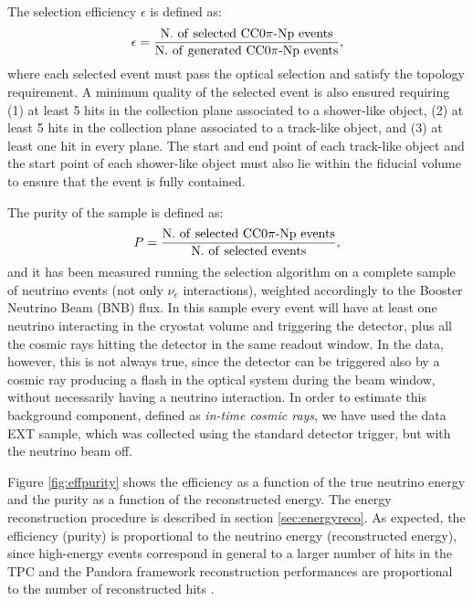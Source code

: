 The selection efficiency $\epsilon$ is defined as:
\begin{equation}
\epsilon = \frac{\mathrm{N.~of~selected~CC0}\pi\mathrm{{\text -}Np~events}}{\mathrm{N.~of~generated~CC0}\pi\mathrm{{\text -}Np~events}},
\end{equation}
where each selected event must pass the optical selection and satisfy the topology requirement. A minimum quality of the selected event is also ensured requiring (1) at least 5 hits in the collection plane associated to a shower-like object, (2) at least 5 hits in the collection plane associated to a track-like object, and (3) at least one hit in every plane.
The start and end point of each track-like object and the start point of each shower-like object must also lie within the fiducial volume to ensure that the event is fully contained.

The purity of the sample is defined as:
\begin{equation}
P = \frac{\mathrm{N.~of~selected~CC0}\pi\mathrm{{\text -}Np~events}}{\mathrm{N.~of~selected~events}},
\end{equation}
and it has been measured running the selection algorithm on a complete sample of neutrino events (not only $\nu_{e}$ interactions), weighted accordingly to the Booster Neutrino Beam (BNB) flux. In this sample every event will have at least one neutrino interacting in the cryostat volume and triggering the detector, plus all the cosmic rays hitting the detector in the same readout window. In the data, however, this is not always true, since the detector can be triggered also by a cosmic ray producing a flash in the optical system during the beam window, without necessarily having a neutrino interaction. In order to estimate this background component, defined as \emph{in-time cosmic rays}, we have used the data EXT sample, which was collected using the standard detector trigger, but with the neutrino beam off.

Figure \ref{fig:effpurity} shows the efficiency as a function of the true neutrino energy and the purity as a function of the reconstructed energy. The energy reconstruction procedure is described in section \ref{sec:energyreco}.
As expected, the efficiency (purity) is proportional to the neutrino energy (reconstructed energy), since high-energy events correspond in general to a larger number of hits in the TPC and the Pandora framework reconstruction performances are proportional to the number of reconstructed hits 
\cite{pandora2}. 


